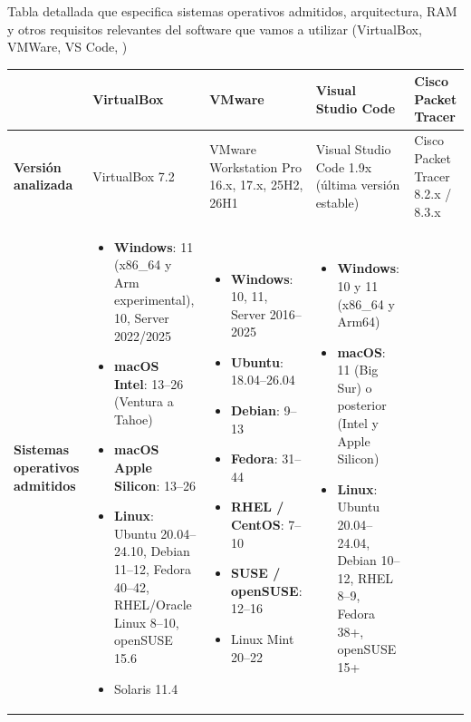 \documentclass[11.5pt]{article}
\begin{document}
	Tabla detallada que especifica sistemas operativos admitidos, arquitectura, RAM y otros requisitos relevantes del software que vamos a utilizar (VirtualBox, VMWare, VS Code, )
	
	\begin{table}[H]
		\centering
		\scriptsize
		\renewcommand{\arraystretch}{1.15}
		\begin{tabularx}{\textwidth}{|l|X|X|X|X|}
			\hline
			& \textbf{VirtualBox} & \textbf{VMware} & \textbf{Visual Studio Code} & \textbf{Cisco Packet Tracer} \\
			\hline
			\textbf{Versión analizada} & 
			VirtualBox 7.2 & 
			VMware Workstation Pro 16.x, 17.x, 25H2, 26H1 & 
			Visual Studio Code 1.9x (última versión estable) & 
			Cisco Packet Tracer 8.2.x / 8.3.x \\
			\hline
			\textbf{Sistemas operativos admitidos} & 
			\begin{itemize}[leftmargin=*,nosep,topsep=0pt]
				\item \textbf{Windows}: 11 (x86\_64 y Arm experimental), 10, Server 2022/2025
				\item \textbf{macOS Intel}: 13–26 (Ventura a Tahoe)
				\item \textbf{macOS Apple Silicon}: 13–26
				\item \textbf{Linux}: Ubuntu 20.04–24.10, Debian 11–12, Fedora 40–42, RHEL/Oracle Linux 8–10, openSUSE 15.6
				\item Solaris 11.4
			\end{itemize} & 
			\begin{itemize}[leftmargin=*,nosep,topsep=0pt]
				\item \textbf{Windows}: 10, 11, Server 2016–2025
				\item \textbf{Ubuntu}: 18.04–26.04
				\item \textbf{Debian}: 9–13
				\item \textbf{Fedora}: 31–44
				\item \textbf{RHEL / CentOS}: 7–10
				\item \textbf{SUSE / openSUSE}: 12–16
				\item Linux Mint 20–22
			\end{itemize} & 
			\begin{itemize}[leftmargin=*,nosep,topsep=0pt]
				\item \textbf{Windows}: 10 y 11 (x86\_64 y Arm64)
				\item \textbf{macOS}: 11 (Big Sur) o posterior (Intel y Apple Silicon)
				\item \textbf{Linux}: Ubuntu 20.04–24.04, Debian 10–12, RHEL 8–9, Fedora 38+, openSUSE 15+

\end{itemize}
\end{tabularx}
\end{table}
\end{document}
